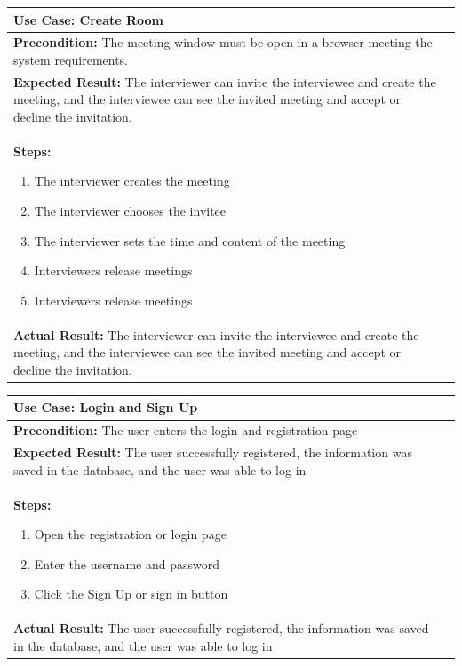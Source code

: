 \documentclass{article}
\begin{document}
  \begin{tabularx}{0.9\textwidth} { 
    | >{\raggedright\arraybackslash}X 
    | >{\centering\arraybackslash}X | }
   \hline
   \textbf{Use Case: Create Room} \\
   \hline
   \textbf{Precondition:} The meeting window must be open in a browser meeting the system requirements.\\
   \hline
   \textbf{Expected Result:} The interviewer can invite the interviewee and create the meeting, and the interviewee can see the invited meeting and accept or decline the invitation.\\
   \hline
   \textbf{Steps:}
   \begin{enumerate}
    \item The interviewer creates the meeting
    \item The interviewer chooses the invitee
    \item The interviewer sets the time and content of the meeting
    \item Interviewers release meetings
    \item Interviewers release meetings
   \end{enumerate}\\
   \hline
   \textbf{Actual Result:} The interviewer can invite the interviewee and create the meeting, and the interviewee can see the invited meeting and accept or decline the invitation.\\
   \hline
  \end{tabularx}

  \begin{tabularx}{0.9\textwidth} { 
    | >{\raggedright\arraybackslash}X 
    | >{\centering\arraybackslash}X | }
   \hline
   \textbf{Use Case: Login and Sign Up} \\
   \hline
   \textbf{Precondition:} The user enters the login and registration page\\
   \hline
   \textbf{Expected Result:} The user successfully registered, the information was saved in the database, and the user was able to log in\\
   \hline
   \textbf{Steps:}
   \begin{enumerate}
    \item Open the registration or login page
    \item Enter the username and password
    \item Click the Sign Up or sign in button
   \end{enumerate}\\
   \hline
   \textbf{Actual Result:} The user successfully registered, the information was saved in the database, and the user was able to log in\\
   \hline
  \end{tabularx}
\end{document}
